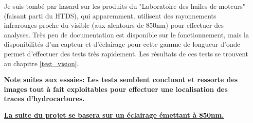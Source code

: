 Je suis tombé par hasard sur les produits du "Laboratoire des huiles de moteurs" (faisant parti du HTDS), qui apparemment, utilisent
des rayonnements infrarouges proche du visible (aux alentours de 850nm) pour effectuer des analyses. Très peu de documentation est disponible sur le fonctionnement,
mais la disponibilités d'un capteur et d'éclairage pour cette gamme de longueur d'onde permet d'effectuer des tests très rapidement.
Les résultats de ces tests se trouvent au chapitre \ref{test_vision}.

\textbf{Note suites aux essaies: Les tests semblent concluant et ressorte des images tout à fait exploitables pour effectuer une localisation des
    traces d'hydrocarbures.}

\textbf{\underline{La suite du projet se basera sur un éclairage émettant à 850nm.}}